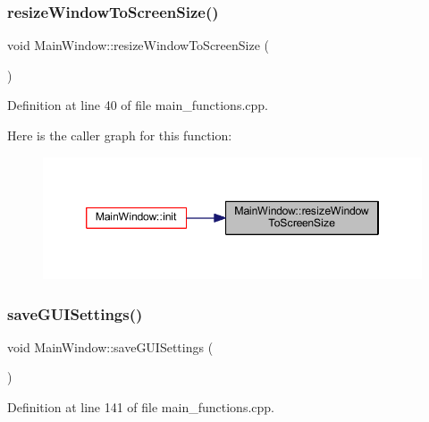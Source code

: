 \subsubsection{\texorpdfstring{resizeWindowToScreenSize()}{resizeWindowToScreenSize()}}
{\footnotesize\ttfamily void Main\+Window\+::resize\+Window\+To\+Screen\+Size (\begin{DoxyParamCaption}{ }\end{DoxyParamCaption})\hspace{0.3cm}{\ttfamily [private]}}



Definition at line 40 of file main\+\_\+functions.\+cpp.

Here is the caller graph for this function\+:
\nopagebreak
\begin{figure}[H]
\begin{center}
\leavevmode
\includegraphics[width=346pt]{class_main_window_abf8d2aa0872c2072510bc93f9f9e4d11_icgraph}
\end{center}
\end{figure}
\mbox{\label{class_main_window_a0806c678c7280ab0a786526522f91418}} 
\subsubsection{\texorpdfstring{saveGUISettings()}{saveGUISettings()}}
{\footnotesize\ttfamily void Main\+Window\+::save\+G\+U\+I\+Settings (\begin{DoxyParamCaption}{ }\end{DoxyParamCaption})\hspace{0.3cm}{\ttfamily [private]}}



Definition at line 141 of file main\+\_\+functions.\+cpp.

